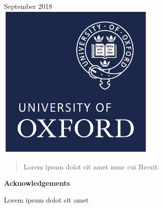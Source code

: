 \documentclass[12pt, a4paper]{memoir}
\begin{document}
\begin{titlingpage}
\begin{minipage}{0.4\textwidth}
\begin{flushright}
	\end{flushright}
	\end{minipage}\\[1cm]
	
	
	
	{\large September 2018}\\[1cm] %
	
	
	\includegraphics[scale=1.2]{logo}\\[1cm] %
\end{titlingpage}


\begin{vplace}[0.7]
\begin{abstract}
Lorem ipsum dolot sit amet nunc cui Brexit.
\end{abstract}
\end{vplace}

\newpage
\vspace*{\fill}
{\centering\huge\bfseries Acknowledgements\par}
\bigskip
\noindent Lorem ipsum dolot sit amet
\vspace*{\fill}
\newpage
\end{document}
